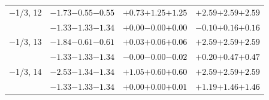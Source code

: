 \documentclass[compress]{beamer}
\begin{document}
\begin{frame}
\begin{tabular}{r | c | c | c}
$-$1/3, 12 & $-1.73$\hspace{0.1 cm}$-0.55$\hspace{0.1 cm}\textcolor{black}{$-0.55$} & $+0.73$\hspace{0.1 cm}$+1.25$\hspace{0.1 cm}\textcolor{black}{$+1.25$} & $+2.59$\hspace{0.1 cm}$+2.59$\hspace{0.1 cm}\textcolor{black}{$+2.59$} \\
           & $-1.33$\hspace{0.1 cm}$-1.33$\hspace{0.1 cm}\textcolor{black}{$-1.34$} & $+0.00$\hspace{0.1 cm}$-0.00$\hspace{0.1 cm}\textcolor{black}{$+0.00$} & $-0.10$\hspace{0.1 cm}$+0.16$\hspace{0.1 cm}\textcolor{black}{$+0.16$} \\
$-$1/3, 13 & $-1.84$\hspace{0.1 cm}$-0.61$\hspace{0.1 cm}\textcolor{black}{$-0.61$} & $+0.03$\hspace{0.1 cm}$+0.06$\hspace{0.1 cm}\textcolor{black}{$+0.06$} & $+2.59$\hspace{0.1 cm}$+2.59$\hspace{0.1 cm}\textcolor{black}{$+2.59$} \\
           & $-1.33$\hspace{0.1 cm}$-1.33$\hspace{0.1 cm}\textcolor{black}{$-1.34$} & $-0.00$\hspace{0.1 cm}$-0.00$\hspace{0.1 cm}\textcolor{black}{$-0.02$} & $+0.20$\hspace{0.1 cm}$+0.47$\hspace{0.1 cm}\textcolor{black}{$+0.47$} \\
$-$1/3, 14 & $-2.53$\hspace{0.1 cm}$-1.34$\hspace{0.1 cm}\textcolor{black}{$-1.34$} & $+1.05$\hspace{0.1 cm}$+0.60$\hspace{0.1 cm}\textcolor{black}{$+0.60$} & $+2.59$\hspace{0.1 cm}$+2.59$\hspace{0.1 cm}\textcolor{black}{$+2.59$} \\
           & $-1.33$\hspace{0.1 cm}$-1.33$\hspace{0.1 cm}\textcolor{black}{$-1.34$} & $+0.00$\hspace{0.1 cm}$+0.00$\hspace{0.1 cm}\textcolor{black}{$+0.01$} & $+1.19$\hspace{0.1 cm}$+1.46$\hspace{0.1 cm}\textcolor{black}{$+1.46$} \\

\end{tabular}
\end{frame}
\end{document}
